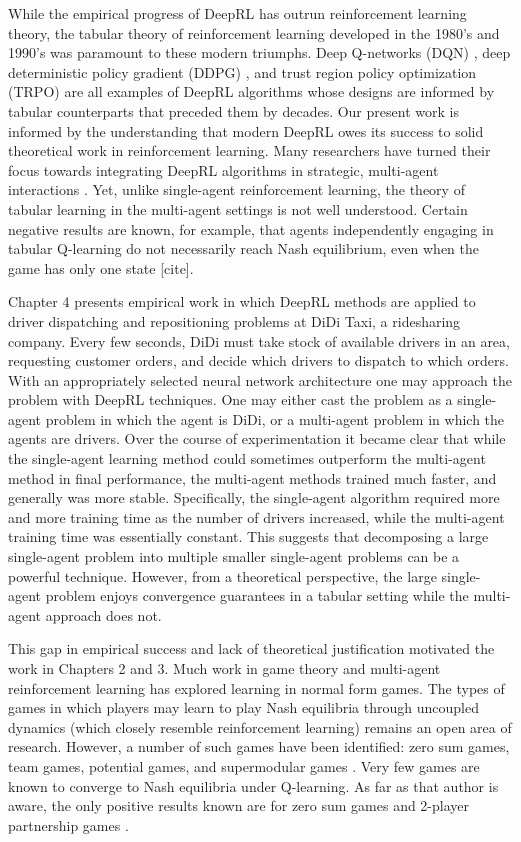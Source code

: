 While the empirical progress of DeepRL has outrun reinforcement learning theory, the tabular theory of reinforcement learning developed in the 1980's and 1990's \cite{watkins1992q, sutton2018reinforcement} was paramount to these modern triumphs. Deep Q-networks (DQN) \cite{mnih2015human}, deep deterministic policy gradient (DDPG) \cite{ddpg}, and trust region policy optimization (TRPO) \cite{trpo} are all examples of DeepRL algorithms whose designs are informed by tabular counterparts that preceded them by decades. Our present work is informed by the understanding that modern DeepRL owes its success to solid theoretical work in reinforcement learning. Many researchers have turned their focus towards integrating DeepRL algorithms in strategic, multi-agent interactions \cite{vinyals2017starcraft}. Yet, unlike single-agent reinforcement learning, the theory of tabular learning in the multi-agent settings is not well understood. Certain negative results are known, for example, that agents independently engaging in tabular Q-learning do not necessarily reach Nash equilibrium, even when the game has only one state [cite]. 


Chapter 4 presents empirical work in which DeepRL methods are applied to driver dispatching and repositioning problems at DiDi Taxi, a ridesharing company. Every few seconds, DiDi must take stock of available drivers in an area, requesting customer orders, and decide which drivers to dispatch to which orders. With an appropriately selected neural network architecture one may approach the problem with DeepRL techniques. One may either cast the problem as a single-agent problem in which the agent is DiDi, or a multi-agent problem in which the agents are drivers. Over the course of experimentation it became clear that while the single-agent learning method could sometimes outperform the multi-agent method in final performance, the multi-agent methods trained much faster, and generally was more stable. Specifically, the single-agent algorithm required more and more training time as the number of drivers increased, while the multi-agent training time was essentially constant. This suggests that decomposing a large single-agent problem into multiple smaller single-agent problems can be a powerful technique. However, from a theoretical perspective, the large single-agent problem enjoys convergence guarantees in a tabular setting while the multi-agent approach does not. 

This gap in empirical success and lack of theoretical justification motivated the work in Chapters 2 and 3. Much work in game theory and multi-agent reinforcement learning has explored learning in normal form games. The types of games in which players may learn to play Nash equilibria through uncoupled dynamics (which closely resemble reinforcement learning) remains an open area of research. However, a number of such games have been identified: zero sum games, team games, potential games, and supermodular games \cite{hofbauer2002global}. Very few games are known to converge to Nash equilibria under Q-learning. As far as that author is aware, the only positive results known are for zero sum games and 2-player partnership games \cite{leslie2005individual}. 

